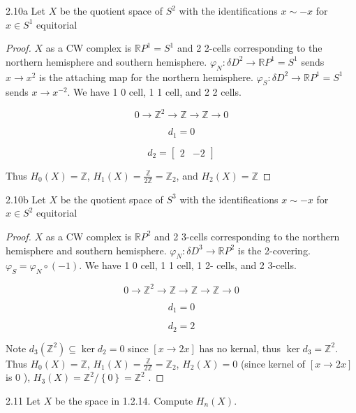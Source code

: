 \documentclass{article}
\newcommand*{\subeq}{\subseteq}
\newcommand{\R}{\mathbb{R}}
\newcommand{\RP}{\mathbb{R} P}
\newcommand{\Z}{\mathbb{Z}}
\begin{document}
\begin{PROB}{2.10a}\label{Problem 2.10a.}
    Let $X$ be the quotient space of $S^2$ with the identifications $x \sim -x$ for $x \in S^1$ equitorial    
\end{PROB}
\begin{proof}
    $X$ as a CW complex is $\RP^1 = S^1$ and 2 2-cells corresponding to the northern hemisphere and southern hemisphere. $\varphi_N: \delta D^2 \to \R P^1 = S^1$ sends $x \to x^2$ is the attaching map for the northern hemisphere. $\varphi_S: \delta D^2 \to \R P^1 = S^1$ sends $x \to x^{-2}$. We have 1 0 cell, 1 1 cell, and 2 2 cells. 
    
    \[0 \to \Z^2 \to \Z \to \Z \to 0\]

    \[d_1 = 0\]

    \[d_2 = \begin{bmatrix}
        2 & -2
    \end{bmatrix}\]

    Thus $H_0(X) = \Z$, $H_1(X) = \frac{\Z}{2 \Z} = \Z_2$, and $H_2(X) = \Z$   
\end{proof}

\begin{PROB}{2.10b}\label{Problem 2.10b.}
    Let $X$ be the quotient space of $S^3$ with the identifications $x \sim -x$ for $x \in S^2$ equitorial    
\end{PROB}
\begin{proof}
    $X$ as a CW complex is $\RP^2$ and 2 3-cells corresponding to the northern hemisphere and southern hemisphere. $\varphi_N: \delta D^3 \to \R P^2$ is the 2-covering. $\varphi_S = \varphi_N \circ (-1)$. We have 1 0 cell, 1 1 cell, 1 2- cells, and 2 3-cells. 
    
    \[0 \to \Z^2 \to \Z \to \Z \to \Z \to 0\]

    \[d_1 = 0\]

    \[d_2 = 2\]

    Note $d_3(\Z^2) \subeq \ker d_2 = 0$ since $[x \to 2x]$ has no kernal, thus $\ker d_3 = \Z^2$. Thus $H_0(X) = \Z$, $H_1(X) = \frac{\Z}{2 \Z} = \Z_2$, $H_2(X) = 0$ (since kernel of $[x \to 2x]$ is 0 ), $H_3(X) = \Z^2 / \left\{ 0 \right\} = \Z^2$ .
\end{proof}


\bigskip

\begin{PROB}{2.11}\label{Problem 2.11.}
    Let $X$ be the space in 1.2.14. Compute $H_n(X)$.   
\end{PROB}
\end{document}
